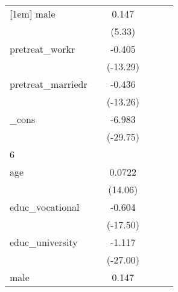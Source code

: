 {\begin{tabular}{l*{5}{c}}
[1em]
male        &                     &       0.147\sym{***}&                     &                     &                     \\
            &                     &      (5.33)         &                     &                     &                     \\
[1em]
pretreat\_workr&                     &      -0.405\sym{***}&                     &                     &                     \\
            &                     &    (-13.29)         &                     &                     &                     \\
[1em]
pretreat\_marriedr&                     &      -0.436\sym{***}&                     &                     &                     \\
            &                     &    (-13.26)         &                     &                     &                     \\
[1em]
\_cons      &                     &      -6.983\sym{***}&                     &                     &                     \\
            &                     &    (-29.75)         &                     &                     &                     \\
\hline
6           &                     &                     &                     &                     &                     \\
age         &                     &      0.0722\sym{***}&                     &                     &                     \\
            &                     &     (14.06)         &                     &                     &                     \\
[1em]
educ\_vocational&                     &      -0.604\sym{***}&                     &                     &                     \\
            &                     &    (-17.50)         &                     &                     &                     \\
[1em]
educ\_university&                     &      -1.117\sym{***}&                     &                     &                     \\
            &                     &    (-27.00)         &                     &                     &                     \\
[1em]
male        &                     &       0.147\sym{***}&                     &                     &                     \\

\end{tabular}}
